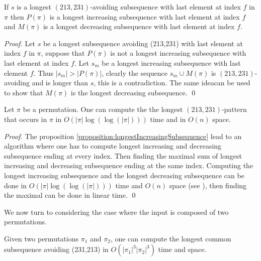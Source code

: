 \documentclass[a4paper]{llncs}
\newcommand{\ptext}{\pi}
\newcounter{num}
\begin{document}
	\begin{proposition}
	\label{proposition:longestIncreasingSubsequence}
	If $s$ is a longest $(213,231)$-avoiding subsequence with last element at index 
	$f$ in $\pi$ then
	$P(\pi)$ is a longest increasing subsequence with last element at index $f$ and
	$M(\pi)$ is a longest decreasing subsequence with last element at index $f$.
	\end{proposition}

	\begin{proof}
	Let $s$ be a longest subsequence avoiding (213,231) with last element at index $f$ in $\pi$,
	suppose that $P(\pi)$ is not a longest increasing subsequence with last element at index $f$. Let $s_m$ be a longest increasing subsequence with last element $f$.
	Thus $|s_m|>|P(\pi)|$, clearly the sequence $s_m \cup M(\pi)$
	is $(213,231)$-avoiding and is longer than $s$, this is a contradiction.
	The same ideacan be used to show that $M(\pi)$ is the longest decreasing subsequence.
	\qed
	\end{proof}

	\begin{proposition}
	Let $\pi$ be a permutation. One can compute the
	the longest $(213,231)$-pattern that occurs in $\pi$
	in $O(|\ptext|\log(\log(|\ptext|)))$ time and in $O(n)$ space.
	\end{proposition}

	\begin{proof}
	The proposition \ref{proposition:longestIncreasingSubsequence} lead to an algorithm
	where one has to compute longest increasing and decreasing subsequence ending at every index. Then finding the maximal sum of longest increasing and decreasing subsequence ending at the same index.
	Computing the longest increasing subsequence and the longest decreasing subsequence can be done in 
	$O(|\ptext|\log(\log(|\ptext|)))$ time and $O(n)$ space 
	(see \cite{Bespamyatnikh00enumeratinglongest}), 
	then finding the maximal can be done in linear time.
	\qed
	\end{proof}

We now turn to considering the case where the input is composed of two permutations.

\begin{proposition}
Given two permutations $\pi_1$ and $\pi_2$,
one can compute 
the longest common subsequence
avoiding (231,213) in $O(|\pi_1|^3|\pi_2|^3)$ time and space.
\end{proposition}
\end{document}
